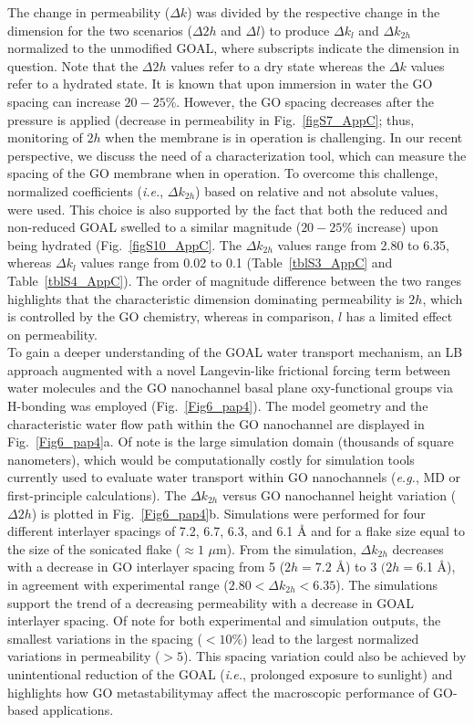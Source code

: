 The change in permeability ($\Delta k$) was divided by the respective change in the dimension for the two scenarios ($\Delta2h$ and $\Delta l$) to produce $\Delta k_l$ and $\Delta k_{2h}$ normalized to the unmodified GOAL, where subscripts indicate the dimension in question. Note that the $\Delta2h$  values refer to a dry state whereas the $\Delta k$ values refer to a hydrated state. It is known that upon immersion in water the GO spacing can increase $20-25$\%.\cite{talyzin2014structure} However, the GO spacing decreases after the pressure is applied (decrease in permeability in Fig.~\ref{figS7_AppC}; thus, monitoring of $2h$ when the membrane is in operation is challenging. In our recent perspective, we discuss the need of a characterization tool, which can measure the spacing of the GO membrane when in operation.\cite{amadei2016increase} To overcome this challenge, normalized coefficients (\textit{i.e.}, $\Delta k_{2h}$) based on relative and not absolute values, were used. This choice is also supported by the fact that both the reduced and non-reduced GOAL swelled to a similar magnitude ($20-25$\% increase) upon being hydrated (Fig.~\ref{figS10_AppC}. The $\Delta k_{2h}$ values range from 2.80 to 6.35, whereas $\Delta k_{l}$ values range from 0.02 to 0.1 (Table~\ref{tblS3_AppC} and Table~\ref{tblS4_AppC}). The order of magnitude difference between the two ranges highlights that the characteristic dimension dominating permeability is $2h$, which is controlled by the GO chemistry, whereas in comparison, $l$ has a limited effect on permeability.\\
To gain a deeper understanding of the GOAL water transport mechanism, an LB approach augmented with a novel Langevin-like frictional forcing term between water molecules and the GO nanochannel basal plane oxy-functional groups via H-bonding was employed (Fig.~\ref{Fig6_pap4}). The model geometry and the characteristic water flow path within the GO nanochannel are displayed in Fig.~\ref{Fig6_pap4}a. Of note is the large simulation domain (thousands of square nanometers), which would be computationally costly for simulation tools currently used to evaluate water transport within GO nanochannels (\textit{e.g.}, MD or first-principle calculations).\cite{boukhvalov2013origin,wei2014understanding,wei2014breakdown} The $\Delta k_{2h}$ versus GO nanochannel height variation ($\Delta2h$) is plotted in Fig.~\ref{Fig6_pap4}b. Simulations were performed for four different interlayer spacings of 7.2, 6.7, 6.3, and 6.1 {\AA} and for a flake size equal to the size of the sonicated flake ($\approx1$ $\mu$m). From the simulation, $\Delta k_{2h}$ decreases with a decrease in GO interlayer spacing from 5 ($2h = 7.2$ {\AA}) to 3 $(2h = 6.$1 {\AA}), in agreement with experimental range ($2.80 < \Delta k_{2h} < 6.35$). The simulations support the trend of a decreasing permeability with a decrease in GOAL interlayer spacing. Of note for both experimental and simulation outputs, the smallest variations in the spacing ($<10$\%) lead to the largest normalized variations in permeability ($>5$). This spacing variation could also be achieved by unintentional reduction of the GOAL (\textit{i.e.}, prolonged exposure to sunlight) and highlights how GO metastability\cite{yeh2015origin,kim2012room}may affect the macroscopic performance of GO-based applications.
